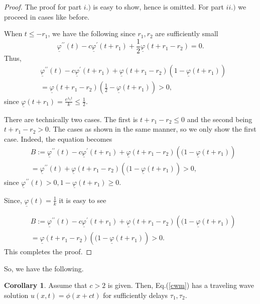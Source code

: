 \documentclass[12pt,letterpaper]{amsart}
\theoremstyle{definition}
\newtheorem{corollary}[theorem]{Corollary}
\theoremstyle{remark}
\numberwithin{equation}{section}
\begin{document}
\begin{proof}
The proof for part $i.)$ is easy to show, hence is omitted. For part $ii.)$ we proceed in cases like before. 

 When $t\le - r_1$, we have the following since $r_1, r_2$ are sufficiently small 
$$
\underline{\varphi}^{\prime\prime}(t)-c\underline{\varphi}^{\prime}(t+r_1)+\frac{1}{2}  \underline{\varphi}(t+r_1-r_2)=0.
$$
Thus,
\begin{align*}
& \underline{\varphi}^{\prime\prime}(t)-c\underline{\varphi}^{\prime}(t+r_1)+\underline{\varphi}(t+r_1-r_2)\left(
1-\underline{\varphi}(t+r_1)\right) \\
&=\underline{\varphi}(t+r_1-r_2)\left(
\frac{1}{2}-\underline{\varphi}(t+r_1)\right)>0,
\end{align*}
since $\underline{\varphi}(t+r_1)=\frac{ e^{\lambda_1 t}}{k}\le \frac{1}{2}.$

\medskip
{}
There are technically two cases. The first is $t+r_1-r_2\le 0$ and the second being $t+r_1-r_2>0$. The cases as shown in the same manner, so we only show the first case. Indeed, the  equation becomes
\begin{align*}
 &B:=\underline{\varphi}^{\prime\prime}(t)-c\underline{\varphi}^{\prime}(t+r_1)+\underline{\varphi}(t+r_1-r_2)\left(
(1-\underline{\varphi}(t+r_1)\right) \\
&=\underline{\varphi}^{\prime\prime}(t)+\underline{\varphi}(t+r_1-r_2)\left(
(1-\underline{\varphi}(t+r_1)\right)>0,
\end{align*}
since $\underline{\varphi}^{\prime\prime}(t)>0, 1-\underline{\varphi}(t+r_1)\ge 0.$

\medskip
{} Since, $\underline{\varphi}(t)=\frac{1}{k}$ it is easy to see

\begin{align*}
 &B:=\underline{\varphi}^{\prime\prime}(t)-c\underline{\varphi}^{\prime}(t+r_1)+\underline{\varphi}(t+r_1-r_2)\left(
(1-\underline{\varphi}(t+r_1)\right) \\
&=\underline{\varphi}(t+r_1-r_2)\left(
(1-\underline{\varphi}(t+r_1)\right)>0.
\end{align*}
This completes the proof.
\end{proof}

\medskip \noindent
So, we have the following.
\begin{corollary}
Assume that $c>2$ is given. Then, Eq.(\ref{cwm}) has a traveling wave solution $u(x,t)=\phi (x+ct)$ for sufficiently delays $\tau_1,\tau_2$.
\end{corollary}
\end{document}
